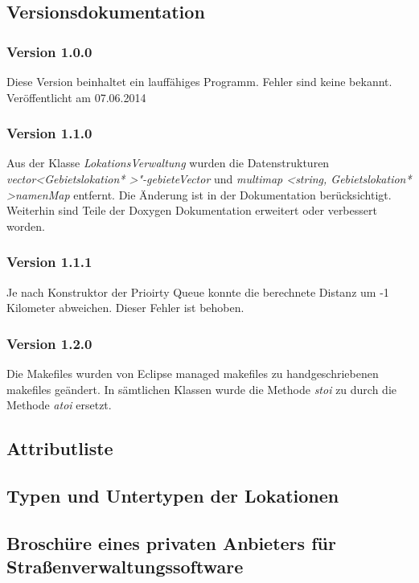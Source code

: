 \documentclass[12pt, a4paper, ngerman]{article}
\begin{document}
\subsection{Versionsdokumentation}
\subsubsection{Version 1.0.0}
Diese Version beinhaltet ein lauffähiges Programm. Fehler sind keine bekannt. Veröffentlicht am 07.06.2014
\subsubsection{Version 1.1.0}
Aus der Klasse \textit{LokationsVerwaltung} wurden die Datenstrukturen \textit{vector\textless Gebietslokation* \textgreater "-gebieteVector} und \textit{multimap \textless string, Gebietslokation* \textgreater namenMap} entfernt. Die Änderung ist in der Dokumentation berücksichtigt. Weiterhin sind Teile der Doxygen Dokumentation erweitert oder verbessert worden.

\subsubsection{Version 1.1.1}
Je nach Konstruktor der Prioirty Queue konnte die berechnete Distanz um -1 Kilometer abweichen. Dieser Fehler ist behoben.

\subsubsection{Version 1.2.0}
Die Makefiles wurden von Eclipse managed makefiles zu handgeschriebenen makefiles geändert. In sämtlichen Klassen wurde die Methode \textit{stoi} zu durch die Methode \textit{atoi} ersetzt.

\subsection{Attributliste \label{bundAttributListe}}


\subsection{Typen und Untertypen der Lokationen \label{bundFeinDoku}}


\subsection{Broschüre eines privaten Anbieters für Straßenverwaltungssoftware \label{bundGDD}}

\end{document}
